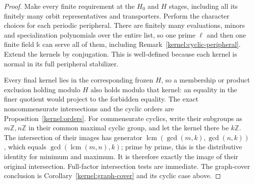 \begin{proof}
Make every finite requirement at the \(H_0\) and \(H\) stages,
including all its finitely many orbit representatives and
transporters.  Perform the character choices for each periodic
peripheral.  There are finitely many evaluations, minors and
specialization polynomials over the entire list, so one prime
\(\ell\) and then one finite field \(\mathbb k\) can serve all of
them, including Remark~\ref{kernel:cyclic-peripheral}.  Extend the
kernels by conjugation.  This is well-defined because each kernel
is normal in its full peripheral stabilizer.

Every final kernel lies in the corresponding frozen \(H\), so a
membership or product exclusion holding modulo \(H\) also holds
modulo that kernel: an equality in the finer quotient would project
to the forbidden equality.  The exact noncommensurate intersections
and the cyclic orders are Proposition~\ref{kernel:orders}.  For
commensurate cyclics, write their subgroups as \(m\mathbb Z,n\mathbb Z\)
in their common maximal cyclic group, and let the kernel there be
\(k\mathbb Z\).  The intersection of their images has generator
\(\operatorname{lcm}(\gcd(m,k),\gcd(n,k))\), which equals
\(\gcd(\operatorname{lcm}(m,n),k)\); prime by prime, this is the
distributive identity for minimum and maximum.  It is therefore
exactly the image of their original intersection.  Full-factor
intersection tests are immediate.  The graph-cover conclusion is
Corollary~\ref{kernel:graph-cover} and its cyclic case above.
\end{proof}
